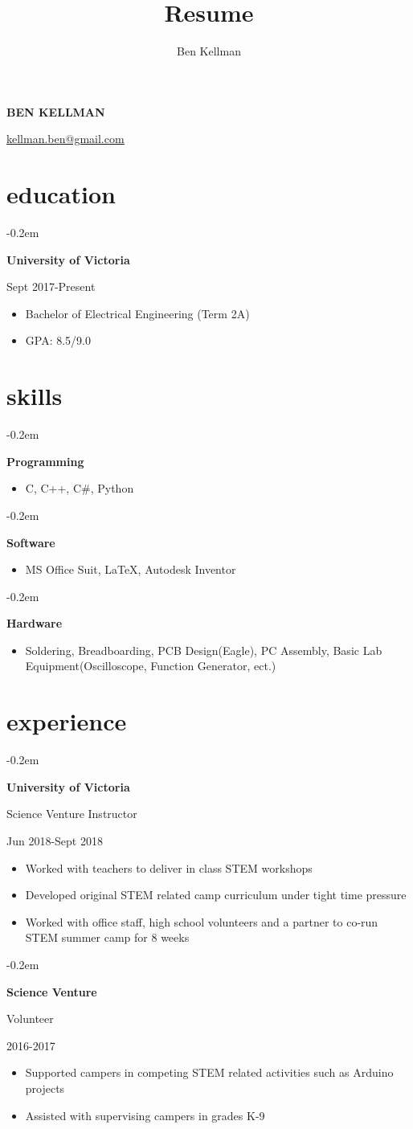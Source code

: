 \documentclass{article}
\author{Ben Kellman}
\title{Resume}
\makeatletter
\renewcommand{\maketitle}{
\begin{center}
    {\bfseries \LARGE \lsstyle \MakeUppercase{Ben Kellman}}
    
    \vspace{0.75em}
    \underline{\href{mailto: kellman.ben@gmail.com}{kellman.ben@gmail.com}}

\end{center}
}
\newcommand{\ritem}[1]{
\item\hfill {#1}
}
\newcommand{\fancybullet}[2]{
{ {


\parbox[t]{5.5cm}{
\begin{minipage}[t]{5.5cm}
   \begin{list}{\quad}{}
   \itemsep-0.2em 
     #1
   \end{list}
\end{minipage}
}  
\parbox[t]{13cm}{
\begin{minipage}[t]{13cm}
   \begin{itemize}
   \itemsep-0.2em 
     #2
   \end{itemize}
\end{minipage}
}}\newline}
}
\makeatother
\begin{document}
\maketitle

\section{education}
\fancybullet{
\ritem{\bfseries University of Victoria}
\ritem{Sept 2017-Present}
}{
\item Bachelor of Electrical Engineering (Term 2A)
\item GPA: 8.5/9.0
}

\section{skills}
\fancybullet{
\ritem{\bfseries Programming}
}{
\item C, C++, C\#, Python
}
\fancybullet{
\ritem{\bfseries Software}
}{
\item MS Office Suit, \LaTeX, Autodesk Inventor 
}

\fancybullet{
\ritem{\bfseries Hardware}
}{
\item Soldering, Breadboarding, PCB Design(Eagle), PC Assembly, Basic Lab \newline Equipment(Oscilloscope, Function Generator, ect.)
}


\section{experience}
\fancybullet{
\ritem {\bfseries University of Victoria}
\ritem {Science Venture Instructor}
\ritem{Jun 2018-Sept 2018}
}{
\item Worked with teachers to deliver in class STEM workshops
\item Developed original STEM related camp curriculum under tight time pressure
\item Worked with office staff, high school volunteers and a partner to co-run STEM summer camp for 8 weeks
}
\vspace{1em}
\fancybullet{
\ritem{\bfseries Science Venture}
\ritem{Volunteer}
\ritem{2016-2017}
}{
\item Supported campers in competing STEM related activities such as Arduino projects 
\item Assisted with supervising campers in grades K-9
}
\end{document}
